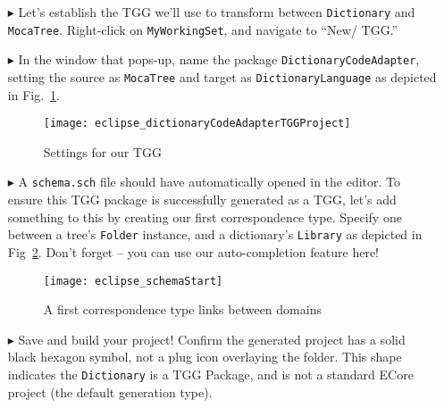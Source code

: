 \begin{enumerate}

\item[$\blacktriangleright$] Let's establish the TGG we'll use to transform between \texttt{Dictionary} and \texttt{MocaTree}. Right-click on
\texttt{MyWorkingSet}, and navigate to ``New/ TGG.''

\item[$\blacktriangleright$] In the window that pops-up, name the package \texttt{DictionaryCodeAdapter}, setting the source as \texttt{MocaTree} and
target as \texttt{DictionaryLanguage} as depicted in Fig.~\ref{eclipse:newTGGProject}.

\begin{figure}[htbp]
\begin{center}
  \texttt{[image: eclipse\_dictionaryCodeAdapterTGGProject]}
  \caption{Settings for our TGG}
  \label{eclipse:newTGGProject}
\end{center}
\end{figure}

\item[$\blacktriangleright$] A \texttt{schema.sch} file should have automatically opened in the editor. To ensure this TGG package is successfully generated as
a TGG, let's add something to this by creating our first correspondence type. Specify one between a tree's \texttt{Folder} instance, and a dictionary's
\texttt{Library} as depicted in Fig~\ref{eclipse:firstSchema}. Don't forget -- you can use our auto-completion feature here!

\begin{figure}[htbp]
\begin{center}
  \texttt{[image: eclipse\_schemaStart]}
  \caption{A first correspondence type links between domains}
  \label{eclipse:firstSchema}
\end{center}
\end{figure}

\item[$\blacktriangleright$] Save and build your project! Confirm the generated project has a solid black hexagon symbol, not a plug icon
overlaying the folder. This shape indicates the \texttt{Dictionary} is a TGG Package, and is not a standard ECore project (the default generation type).

\end{enumerate}
